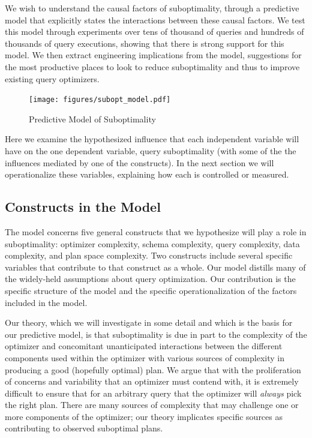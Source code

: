 \documentclass[prodmode,acmtods]{acmsmall}
\begin{document}
We wish to understand the causal factors of suboptimality, through a
predictive model that explicitly states the interactions between these
causal factors. We test this model through experiments over tens of thousand
of queries and hundreds of thousands of query executions, showing that there
is strong support for this model. We then extract engineering implications
from the model, suggestions for the most productive places to look to reduce
suboptimality and thus to improve existing query optimizers.

\begin{figure}[tb]
\centering
\texttt{[image: figures/subopt\_model.pdf]}
\caption{Predictive Model of Suboptimality\label{fig:model}}
\vspace*{3ex}
\end{figure}

Here we examine the hypothesized influence that each independent
variable will have on the one dependent variable, query suboptimality (with
some of the the influences mediated by one of the constructs). In
the next section we will operationalize these variables, explaining how
each is controlled or measured.

\subsection{Constructs in the Model}

The model concerns five general
constructs that we \hbox{hypothesize} will play a role in suboptimality: optimizer
complexity, schema complexity, query complexity, data complexity, and plan space complexity.
Two constructs include several specific variables that contribute to that
construct as a whole. Our model distills many of the widely-held assumptions
about query optimization. Our contribution is the specific \hbox{structure} of
the model and the specific operationalization of the
\hbox{factors} included in the model.

Our theory, which we will investigate in some detail and which is the
basis for our predictive model, is that suboptimality is due in part
to the complexity of the optimizer and concomitant unanticipated
interactions between the different components used within the 
optimizer with various sources of complexity in producing a good (hopefully
optimal) plan.  We argue that with the proliferation of concerns and
variability that an optimizer must contend with, it is extremely
difficult to ensure that for an arbitrary query that the optimizer
will {\em always} pick the right plan. There are many sources of complexity
that may challenge one or more components of the optimizer; our theory
implicates specific sources as contributing to observed
suboptimal plans.
\end{document}

